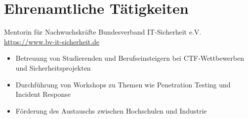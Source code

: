 \documentclass[a4paper, serif, 10pt]{moderncv}
\begin{document}
\section{Ehrenamtliche Tätigkeiten}

        {Mentorin für Nachwuchskräfte}
        {Bundesverband IT-Sicherheit e.V.}
        {\url{https://www.bv-it-sicherheit.de}}
        {}
        {\begin{itemize}
\item Betreuung von Studierenden und Berufseinsteigern bei CTF-Wettbewerben und Sicherheitsprojekten
\item Durchführung von Workshops zu Themen wie Penetration Testing und Incident Response
\item Förderung des Austauschs zwischen Hochschulen und Industrie
\end{itemize}}
    
\end{document}
